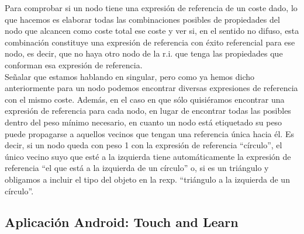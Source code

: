 \documentclass[10pt,a4paper]{article}
\begin{document}
Para comprobar si un nodo tiene una expresión de referencia de un coste dado, lo que hacemos es elaborar todas las combinaciones posibles de propiedades del nodo que alcancen como coste total ese coste y ver si, en el sentido no difuso, esta combinación constituye una expresión de referencia con éxito referencial para ese nodo, es decir, que no haya otro nodo de la r.i. que tenga las propiedades que conforman esa expresión de referencia.\\

Señalar que estamos hablando en singular, pero como ya hemos dicho anteriormente para un nodo podemos encontrar diversas expresiones de referencia con el mismo coste. Además, en el caso en que sólo quisiéramos encontrar una expresión de referencia para cada nodo, en lugar de encontrar todas las posibles dentro del peso mínimo necesario, en cuanto un nodo está etiquetado su peso puede propagarse a aquellos vecinos que tengan una referencia única hacia él. Es decir, si un nodo queda con peso 1 con la expresión de referencia ``círculo'', el único vecino suyo que esté a la izquierda tiene automáticamente la expresión de referencia ``el que está a la izquierda de un círculo'' o, si es un triángulo y obligamos a incluir el tipo del objeto en la rexp. ``triángulo a la izquierda de un círculo''.\\
\subsection{Aplicación Android: Touch and Learn}
\newpage

\nocite{*}


\end{document}
